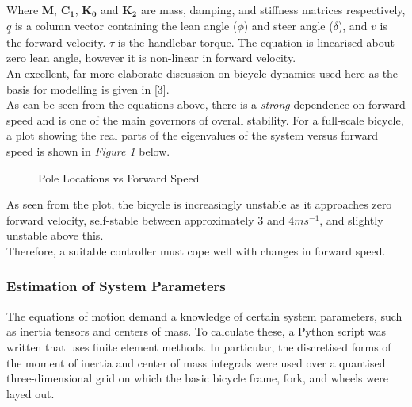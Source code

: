 \documentclass[12pt]{article}
\begin{document}
\noindent Where $\mathbf{M}$, $\mathbf{C_1}$, $\mathbf{K_0}$ and $\mathbf{K_2}$ are mass, damping, and stiffness matrices respectively, $\underline{q}$ is a column vector containing the lean angle ($\phi$) and steer angle ($\delta$), and $v$ is the forward velocity. $\tau$ is the handlebar torque. The equation is linearised about zero lean angle, however it is non-linear in forward velocity. \\

\noindent An excellent, far more elaborate discussion on bicycle dynamics used here as the basis for modelling is given in [3]. \\

\noindent As can be seen from the equations above, there is a \textit{strong} dependence on forward speed and is one of the main governors of overall stability. For a full-scale bicycle, a plot showing the real parts of the eigenvalues of the system versus forward speed is shown in \textit{Figure 1} below.

\begin{figure}[H]
	\centering
	\caption{Pole Locations vs Forward Speed}
\end{figure}

\noindent As seen from the plot, the bicycle is increasingly unstable as it approaches zero forward velocity, self-stable between approximately $3$ and $4ms^{-1}$, and slightly unstable above this. \\

\noindent Therefore, a suitable controller must cope well with changes in forward speed.

\subsubsection{Estimation of System Parameters}
The equations of motion demand a knowledge of certain system parameters, such as inertia tensors and centers of mass. To calculate these, a Python script was written that uses finite element methods. In particular, the discretised forms of the moment of inertia and center of mass integrals were used over a quantised three-dimensional grid on which the basic bicycle frame, fork, and wheels were layed out.
\end{document}
